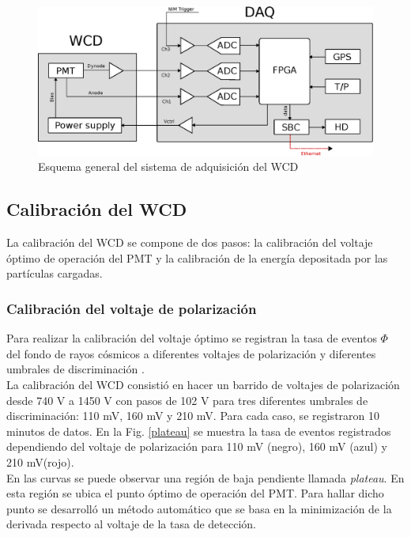 \begin{figure}[h!]
\centering
\includegraphics[scale=0.7]{Figures/WCDDAQ.eps}
\caption{Esquema general del sistema de adquisición del WCD}
\label{WCDDAQ}
\end{figure}

\subsection{Calibración del WCD}

La calibración del WCD se compone de dos pasos: la calibración del voltaje óptimo de operación del PMT y la calibración de la energía depositada por las partículas cargadas.\\

\subsubsection{Calibración del voltaje de polarización}

Para realizar la calibración del voltaje óptimo se registran la tasa de eventos $\Phi$ del fondo de rayos cósmicos a diferentes voltajes de polarización y diferentes umbrales de discriminación \cite{Leon2017}.\\

La calibración del WCD consistió en hacer un barrido de voltajes de polarización desde 740 V a 1450 V con pasos de 102 V para tres diferentes umbrales de discriminación: 110 mV, 160 mV y 210 mV. Para cada caso, se registraron 10 minutos de datos. En la Fig. \ref{plateau} se muestra la tasa de eventos registrados dependiendo del voltaje de polarización para 110 mV (negro), 160 mV (azul) y 210 mV(rojo).\\

En las curvas se puede observar una región de baja pendiente llamada \textit{plateau}. En esta región se ubica el punto óptimo de operación del PMT. Para hallar dicho punto se desarrolló un método automático que se basa en la minimización de la derivada respecto al voltaje de la tasa de detección.\\

